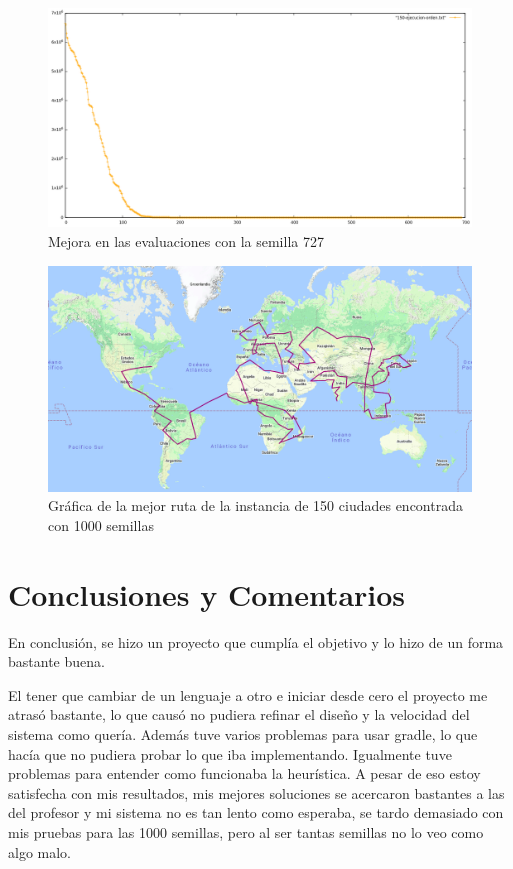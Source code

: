 \documentclass{article}
\begin{document}
\begin{figure}[H]
	\includegraphics[width=\textwidth,height=\textheight,keepaspectratio]{imgs/grafica150Mejor.png}
	\caption{Mejora en las evaluaciones con la semilla 727}
\end{figure}

\begin{figure}[H]
	\includegraphics[width=\textwidth,height=\textheight,keepaspectratio]{imgs/mejorruta150.png}
	\caption{Gráfica de la mejor ruta de la instancia de 150 ciudades encontrada con 1000 semillas}
\end{figure}
\section{Conclusiones y Comentarios}

En conclusión, se hizo un proyecto que cumplía el objetivo y lo hizo de un forma bastante buena.

El tener que cambiar de un lenguaje a otro e iniciar desde cero el proyecto me atrasó bastante, lo que causó no pudiera refinar el diseño y la velocidad del sistema como quería. Además tuve varios problemas para usar gradle, lo que hacía que no pudiera probar lo que iba implementando. Igualmente tuve problemas para entender como funcionaba la heurística. A pesar de eso estoy satisfecha con mis resultados, mis mejores soluciones se acercaron bastantes a las del profesor y mi sistema no es tan lento como esperaba, se tardo demasiado con mis pruebas para las 1000 semillas, pero al ser tantas semillas no lo veo como algo malo.
\end{document}
